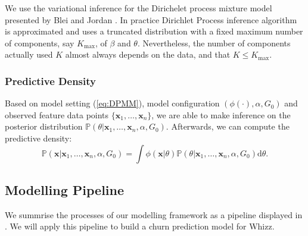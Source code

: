 We use the variational inference for the Dirichelet process mixture model presented by Blei and Jordan \cite{blei2006}. In practice Dirichlet Process inference algorithm is approximated and uses a truncated distribution with a fixed maximum number of components, say $K_{\max}$, of $\beta$ and $\theta$. Nevertheless, the number of components actually used $K$ almost always depends on the data, and that $K \leq K_{\max}$.

\subsubsection{Predictive Density}

Based on model setting (\ref{eq:DPMM}), model configuration $(\phi(\cdot), \alpha, G_0)$ and observed feature data points $\{ \mathbf{x}_1, \dots, \mathbf{x}_n \}$, we are able to make inference on the posterior distribution $\mathbb{P}(\theta | \mathbf{x}_1, \dots, \mathbf{x}_n, \alpha, G_0)$. Afterwards, we can compute the predictive density:
\begin{equation}
\mathbb{P} (\mathbf{x} | \mathbf{x}_1, \dots, \mathbf{x}_n, \alpha, G_0) = \int \phi(\mathbf{x} | \theta ) \mathbb{P}(\theta | \mathbf{x}_1, \dots, \mathbf{x}_n, \alpha, G_0) \text{d} \theta.
\end{equation}

\subsection{Modelling Pipeline}

We summrise the processes of our modelling framework as a pipeline displayed in . We will apply this pipeline to build a churn prediction model for Whizz.

